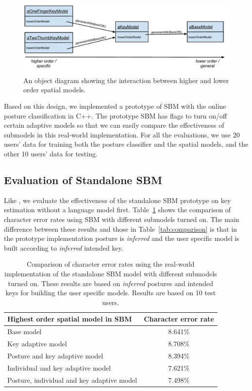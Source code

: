 \documentclass{sigchi}
\newcommand\tabhead[1]{\small\textbf{#1}}
\begin{document}
\begin{figure}[tb]
  \centering
  \includegraphics[width=1\columnwidth]{figures/chain-of-responsibility.pdf}
  \caption{An object diagram showing the interaction between higher and lower
  order spatial models.}
  \label{fig:chain-of-responsibility}
\end{figure}

Based on this design, we implemented a prototype of SBM with the online posture 
classification in C++. The prototype SBM has flags to turn on/off certain adaptive
 models so that we can easily compare the effectiveness of submodels in this real-world implementation. 
 For all the evaluations, we use 20 users' data for training both the posture classifier 
 and the spatial models, and the other 10 users' data for testing. 

\subsection{Evaluation of Standalone SBM}
Like \cite{Findlater:2012, Rudchenko:2011}, we evaluate the effectiveness of the standalone SBM  prototype on key estimation without a language model first. 
Table~\ref{tab:off-device} shows the comparison of
character error rates using SBM with different submodels turned on. The main difference between these results and those in Table~\ref{tab:comparison} is that in the prototype implementation posture is \textit{inferred} and the user specific model is built according to \textit{inferred} intended key.

\begin{table}[tb]
  \centering
  \begin{tabular}{|l|c|}
  \hline
  \tabhead{Highest order spatial model in SBM} &   \multicolumn{1}{|p{0.2\columnwidth}|}{\tabhead{Character error rate}} \\
  \hline
 Base model & 8.641\% \\
  \hline
  Key adaptive model & 8.708\% \\
  \hline
    \multicolumn{1}{|p{0.7\columnwidth}|}{Posture and key adaptive model} & 8.394\% \\
  \hline
  Individual and key adaptive model  & 7.621\%
  \\
  \hline
  Posture, individual and key adaptive model &  7.498\%
  \\
  \hline
  \end{tabular}
  \caption{Comparison of character error rates using the real-world implementation of the standalone SBM model with different submodels turned on.  These results are based on \textit{inferred} postures and intended keys for building the user specific models. Results are based on 10 test users.}
  \label{tab:off-device}
\end{table}
\end{document}
